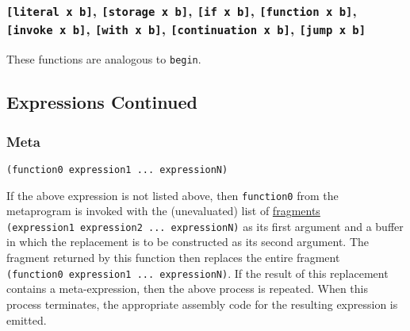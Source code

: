 \documentclass[]{article}
\begin{document}
\hypertarget{ux7bux5bux7dliteral-x-bux7bux5dux7dux2c-ux7bux5bux7dstorage-x-bux7bux5dux7dux2c-ux7bux5bux7dif-x-bux7bux5dux7dux2c-ux7bux5bux7dfunction-x-bux7bux5dux7dux2c-ux7bux5bux7dinvoke-x-bux7bux5dux7dux2c-ux7bux5bux7dwith-x-bux7bux5dux7dux2c-ux7bux5bux7dcontinuation-x-bux7bux5dux7dux2c-ux7bux5bux7djump-x-bux7bux5dux7d}{%
\subsubsection{\texorpdfstring{\texttt{{[}literal\ x\ b{]}},
\texttt{{[}storage\ x\ b{]}}, \texttt{{[}if\ x\ b{]}},
\texttt{{[}function\ x\ b{]}}, \texttt{{[}invoke\ x\ b{]}},
\texttt{{[}with\ x\ b{]}}, \texttt{{[}continuation\ x\ b{]}},
\texttt{{[}jump\ x\ b{]}}}{{[}literal x b{]}, {[}storage x b{]}, {[}if x b{]}, {[}function x b{]}, {[}invoke x b{]}, {[}with x b{]}, {[}continuation x b{]}, {[}jump x b{]}}}\label{ux7bux5bux7dliteral-x-bux7bux5dux7dux2c-ux7bux5bux7dstorage-x-bux7bux5dux7dux2c-ux7bux5bux7dif-x-bux7bux5dux7dux2c-ux7bux5bux7dfunction-x-bux7bux5dux7dux2c-ux7bux5bux7dinvoke-x-bux7bux5dux7dux2c-ux7bux5bux7dwith-x-bux7bux5dux7dux2c-ux7bux5bux7dcontinuation-x-bux7bux5dux7dux2c-ux7bux5bux7djump-x-bux7bux5dux7d}}

These functions are analogous to \texttt{begin}.

\hypertarget{expressions-continued}{%
\subsection{Expressions Continued}\label{expressions-continued}}

\hypertarget{meta}{%
\subsubsection{Meta}\label{meta}}

\begin{verbatim}
(function0 expression1 ... expressionN)
\end{verbatim}

If the above expression is not listed above, then \texttt{function0}
from the metaprogram is invoked with the (unevaluated) list of
\protect\hyperlink{internal-representation}{fragments}
\texttt{(expression1\ expression2\ ...\ expressionN)} as its first
argument and a buffer in which the replacement is to be constructed as
its second argument. The fragment returned by this function then
replaces the entire fragment
\texttt{(function0\ expression1\ ...\ expressionN)}. If the result of
this replacement contains a meta-expression, then the above process is
repeated. When this process terminates, the appropriate assembly code
for the resulting expression is emitted.
\end{document}
